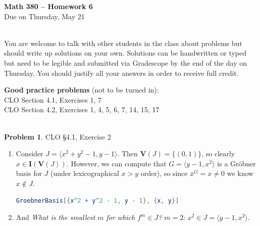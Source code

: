 \documentclass[12pt]{amsart}
\theoremstyle{definition}
\newtheorem{prob}{Problem}
\begin{document}
 \thispagestyle{empty}
\begin{center} {\large \textbf{Math 380 -- Homework  6}} \smallskip \\ 
Due on Thursday, May 21\ \\ \ \\
 \end{center}

You are welcome to talk with other students in the class about problems but should write up solutions on your own. 
Solutions can be handwritten or typed but need to be legible and submitted via Gradescope by the end of the day 
on Thursday. You should justify all your answers in order to receive full credit.  
\bigskip 

\begin{flushleft}

{\bf Good practice problems} (not to be turned in): \\

CLO Section 4.1, Exercises 1, 7 \\
CLO Section 4.2, Exercises 1, 4, 5, 6, 7, 14, 15, 17 \\
\ \ \\
\bigskip 




\begin{prob} CLO \S4.1, Exercise 2 \smallskip \\ 
\begin{enumerate}
\item[(a)] Consider $J = \langle x^2+y^2-1,y-1\rangle$. Then $\mathbf V(J) = \{ (0, 1) \}$, so clearly $x \in \mathbf I(\mathbf V(J))$. However, we can compute that $G=\langle y-1,x^2\rangle$ is a Gr\"obner basis for $J$ (under lexicographical $x > y$ order), so since $\overline{x}^G = x \neq 0$ we know $x \not\in J$. 

\begin{lstlisting}[language=Mathematica]
GroebnerBasis[{x^2 + y^2 - 1, y - 1}, {x, y}]
\end{lstlisting}
\item[(b)] And \emph{What is the smallest $m$ for which $f^m\in J$?} $m=2$: $x^2 \in J = \langle y-1,x^2\rangle$.
\end{enumerate}
\end{prob}

\bigskip 



\end{flushleft}
\end{document}
